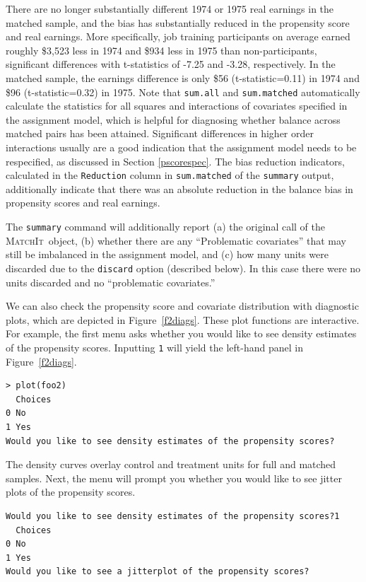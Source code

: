 \documentclass[oneside,letterpaper,titlepage]{article}
\newcommand{\MatchIt}{\textsc{MatchIt}}
\begin{document}
There are no longer substantially different 1974 or 1975 real earnings in the
matched sample, and the bias has substantially reduced in the
propensity score and real earnings.  More specifically, job training
participants on average earned roughly \$3,523 less in 1974 and \$934 less in 1975 than
non-participants, significant differences with t-statistics of
-7.25 and -3.28, respectively.  In the matched sample, the earnings difference
is only \$56 (t-statistic=0.11) in 1974 and \$96 (t-statistic=0.32)
in 1975.  Note that \texttt{sum.all} and
\texttt{sum.matched} automatically calculate the statistics for all
squares and interactions of covariates specified in the assignment
model, which is helpful for diagnosing whether balance across
matched pairs has been attained.  Significant differences in higher
order interactions usually are a good indication that the assignment
model needs to be respecified, as discussed in Section \ref{pscorespec}.  The bias reduction indicators,
calculated in the 
\texttt{Reduction} column in \texttt{sum.matched} of the {\tt summary} output, additionally
indicate that there was an absolute reduction in the balance bias in propensity scores and real earnings.

The \texttt{summary} command will additionally report (a) the original
call of the \MatchIt\ object, (b) whether there are any ``Problematic
covariates'' that may still be imbalanced in the assignment model, and
(c) how many units were discarded due to the \texttt{discard} option
(described below).  In this case there were no units discarded and no ``problematic covariates.''  

We can also check the propensity score and covariate distribution with
diagnostic plots, which are depicted in Figure~\ref{f2diags}.  These
plot functions are interactive.  For example, the first menu asks
whether you would like to see density estimates of the propensity
scores.  Inputting \texttt{1} will yield the left-hand panel in
Figure~\ref{f2diags}.

\begin{verbatim}
> plot(foo2)
  Choices
0 No     
1 Yes    
Would you like to see density estimates of the propensity scores?
\end{verbatim}

The density curves overlay control and treatment units for full and
matched samples.  Next, the menu will prompt you whether you would
like to see jitter plots of the propensity scores.

\begin{verbatim}
Would you like to see density estimates of the propensity scores?1
  Choices
0 No     
1 Yes    
Would you like to see a jitterplot of the propensity scores?
\end{verbatim}
\end{document}
